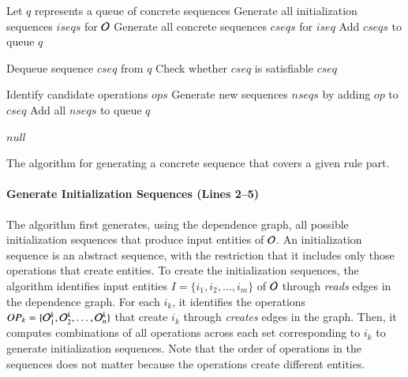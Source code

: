 \begin{algorithm}[t]
\footnotesize
\SetAlgoVlined
{}
\BlankLine

\nl Let $q$ represents a queue of concrete sequences\;
\nl Generate all initialization sequences $iseqs$ for ${\cal O}$\;
\nl {}
{
		\nl Generate all concrete sequences $cseqs$ for $iseq$\;
		\nl Add $cseqs$ to queue $q$\;
} 

\nl {}
{
		\nl Dequeue sequence $cseq$ from $q$\;
		\nl Check whether $cseq$ is satisfiable\;
		\nl {}
		{
				\Return $cseq$\;
		}
		
		\nl Identify candidate operations $ops$\;		
		\nl {}
		{
			\nl Generate new sequences $nseqs$ by adding $op$ to $cseq$\;
			\nl Add all $nseqs$ to queue $q$\;
		}
}

\Return $null$\;
		
\caption{\label{alg:guidedsearch} \small The algorithm for
  generating a concrete sequence that covers a given rule part.}
\end{algorithm}

\paragraph*{Generate Initialization Sequences (Lines 2--5)} The algorithm first
generates, using the dependence graph, all possible initialization sequences
that produce input entities of ${\cal O}$. An initialization sequence is an
abstract sequence, with the restriction that it includes only those operations
that create entities. To create the initialization sequences, the algorithm
identifies input entities $I = \{i_1, i_2, \ldots, i_m\}$ of ${\cal O}$ through
\textit{reads} edges in the dependence graph. For each $i_k$, it identifies the
operations $OP_k = \{{\cal O}^k_1, {\cal O}^k_2, \ldots, {\cal O}^k_n\}$ that
create $i_k$ through \textit{creates} edges in the graph.
Then, it computes combinations of all operations across each set corresponding
to $i_k$ to generate initialization sequences. 
Note that the order of operations in the sequences
does not matter because the operations create different entities.  


